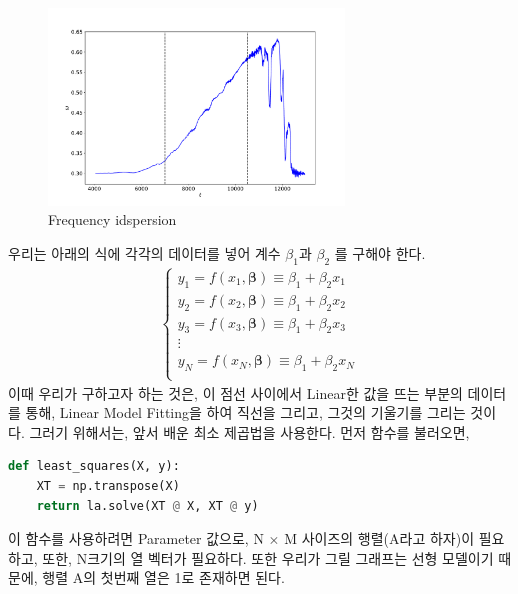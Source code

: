 \documentclass[11pt]{article}
\begin{document}
\begin{figure}[!ht]
  \centering
  \includegraphics[width=0.7\textwidth]{Frequency_idspersion.pdf}
  \caption{Frequency idspersion}
\end{figure}
우리는 아래의 식에 각각의 데이터를 넣어 계수 $\beta_{1}$과 $\beta_{2}$ 를 구해야 한다. 
\begin{equation}
\begin{split}
\left\{
\begin{array}{r}
y_1 = f(x_1, \boldsymbol{\beta}) \equiv \beta_{1} + \beta_{2}x_1 \\
y_2 = f(x_2, \boldsymbol{\beta}) \equiv \beta_{1} + \beta_{2}x_2 \\
y_3 = f(x_3, \boldsymbol{\beta}) \equiv \beta_{1} + \beta_{2}x_3 \\
\vdots  \\
y_N = f(x_N, \boldsymbol{\beta}) \equiv \beta_{1} + \beta_{2}x_N \\
\end{array}
\right.
\end{split}
\end{equation}
이때 우리가 구하고자 하는 것은, 이 점선 사이에서 Linear한 값을 뜨는 부분의 데이터를 통해, Linear Model Fitting을 하여 직선을 그리고, 그것의 기울기를 그리는 것이다. 그러기 위해서는, 앞서 배운 최소 제곱법을 사용한다. 먼저 함수를 불러오면,
\begin{lstlisting}[language=Python]
def least_squares(X, y):
    XT = np.transpose(X)
    return la.solve(XT @ X, XT @ y)
\end{lstlisting}
이 함수를 사용하려면 Parameter 값으로, N $\times$ M 사이즈의 행렬(A라고 하자)이 필요하고, 또한, N크기의 열 벡터가 필요하다. 또한 우리가 그릴 그래프는 선형 모델이기 때문에, 행렬 A의 첫번째 열은 1로 존재하면 된다. 
\end{document}
